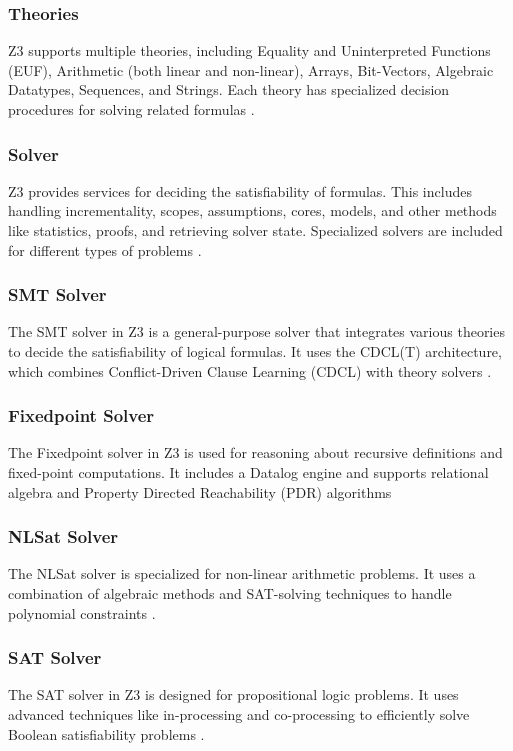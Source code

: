\documentclass[]{rptuseminar}
\begin{document}
\subsubsection{Theories}
Z3 supports multiple theories, including Equality and Uninterpreted Functions (EUF), Arithmetic (both linear and non-linear),
Arrays, Bit-Vectors, Algebraic Datatypes, Sequences, and Strings. Each theory has specialized decision procedures for solving
related formulas \cite{nikolaj_bjorner_programming_nodate}.


\subsubsection{Solver}
Z3 provides services for deciding the satisfiability of formulas. This includes handling incrementality, scopes, assumptions, 
cores, models, and other methods like statistics, proofs, and retrieving solver state. Specialized solvers are included for 
different types of problems \cite{nikolaj_bjorner_programming_nodate}.

\subsubsection*{SMT Solver}
The SMT solver in Z3 is a general-purpose solver that integrates various theories to decide the satisfiability of logical formulas. 
It uses the CDCL(T) architecture, which combines Conflict-Driven Clause Learning (CDCL) with theory solvers \cite{nikolaj_bjorner_programming_nodate}.

\subsubsection*{Fixedpoint Solver}
The Fixedpoint solver in Z3 is used for reasoning about recursive definitions and fixed-point computations. 
It includes a Datalog engine and supports relational algebra and Property Directed Reachability (PDR) algorithms \cite{nikolaj_bjorner_programming_nodate} 

\subsubsection*{NLSat Solver}
The NLSat solver is specialized for non-linear arithmetic problems. 
It uses a combination of algebraic methods and SAT-solving techniques to handle polynomial constraints \cite{nikolaj_bjorner_programming_nodate}.

\subsubsection*{SAT Solver}
The SAT solver in Z3 is designed for propositional logic problems. It uses advanced techniques like in-processing 
and co-processing to efficiently solve Boolean satisfiability problems \cite{nikolaj_bjorner_programming_nodate}.
\end{document}
